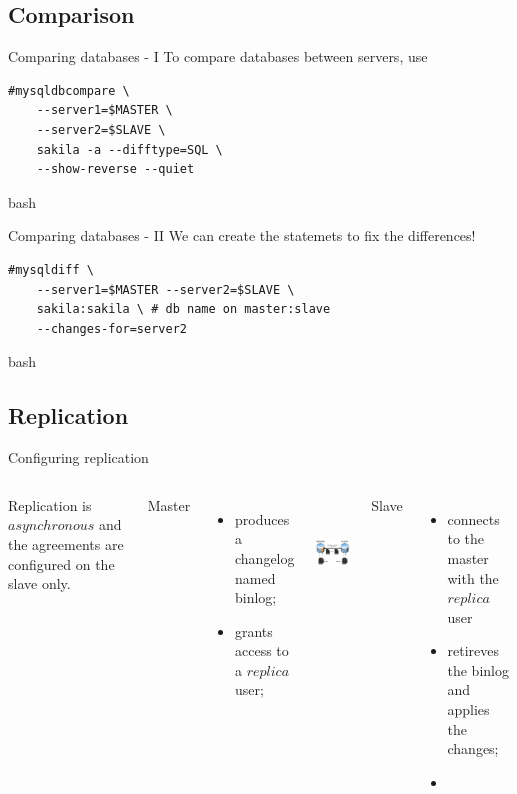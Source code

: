 \documentclass{beamer}[10]
\begin{document}
%
%
\subsection{Comparison}
\begin{pyframe}{Comparing databases - I}
To compare databases between servers, use
\begin{verbatim}
#mysqldbcompare \
    --server1=$MASTER \
    --server2=$SLAVE \
    sakila -a --difftype=SQL \
    --show-reverse --quiet
\end{verbatim}{bash}

\end{pyframe}


\begin{pyframe}{Comparing databases - II}
We can create the statemets to fix the differences!
\begin{verbatim}
#mysqldiff \
    --server1=$MASTER --server2=$SLAVE \
    sakila:sakila \ # db name on master:slave
    --changes-for=server2
\end{verbatim}{bash}
\end{pyframe}


%
%
\subsection{Replication}
\begin{pyframe}{Configuring replication}
\begin{columns}
Replication is $asynchronous$ and the agreements are configured on the slave only.

    {\large Master}
    \begin{itemize}
    \item produces a changelog named binlog;
    \item grants access to a $replica$ user;
    \end{itemize}
\includegraphics[height=3cm]{images/mysql-replica-hla.jpg}

    {\large Slave}
    \begin{itemize}
    \item connects to the master with the $replica$ user
    \item retireves the binlog and applies the changes;
    \item \code{START SLAVE;}
    \end{itemize}
\end{columns}
\end{pyframe}
\end{document}
